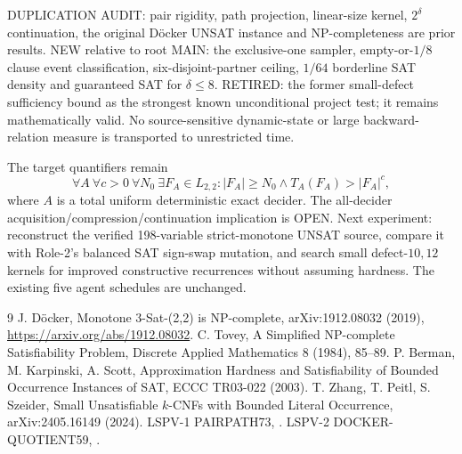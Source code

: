 \documentclass[11pt]{article}
\begin{document}
DUPLICATION AUDIT: pair rigidity, path projection, linear-size kernel, $2^\delta$ continuation, the original Döcker UNSAT instance and NP-completeness are prior results. NEW relative to root MAIN: the exclusive-one sampler, empty-or-$1/8$ clause event classification, six-disjoint-partner ceiling, $1/64$ borderline SAT density and guaranteed SAT for $\delta\le8$. RETIRED: the former small-defect sufficiency bound as the strongest known unconditional project test; it remains mathematically valid. No source-sensitive dynamic-state or large backward-relation measure is transported to unrestricted time.

The target quantifiers remain
\[
\forall A\ \forall c>0\ \forall N_0\ \exists F_A\in L_{2,2}:
 |F_A|\ge N_0\land T_A(F_A)>|F_A|^c,
\]
where $A$ is a total uniform deterministic exact decider. The all-decider acquisition/compression/continuation implication is OPEN. Next experiment: reconstruct the verified 198-variable strict-monotone UNSAT source, compare it with Role-2's balanced SAT sign-swap mutation, and search small defect-$10,12$ kernels for improved constructive recurrences without assuming hardness. The existing five agent schedules are unchanged.

\begin{thebibliography}{9}
 J. D\"ocker, Monotone 3-Sat-(2,2) is NP-complete, arXiv:1912.08032 (2019), \url{https://arxiv.org/abs/1912.08032}.
 C. Tovey, A Simplified NP-complete Satisfiability Problem, Discrete Applied Mathematics 8 (1984), 85--89.
 P. Berman, M. Karpinski, A. Scott, Approximation Hardness and Satisfiability of Bounded Occurrence Instances of SAT, ECCC TR03-022 (2003).
 T. Zhang, T. Peitl, S. Szeider, Small Unsatisfiable $k$-CNFs with Bounded Literal Occurrence, arXiv:2405.16149 (2024).
 LSPV-1 PAIRPATH73, .
 LSPV-2 DOCKER-QUOTIENT59, .
\end{thebibliography}
\end{document}
